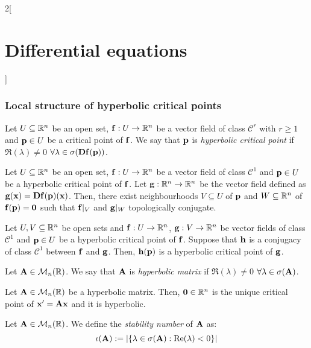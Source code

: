 \documentclass[../../../main_math.tex]{subfiles}
\begin{document}
\begin{multicols}{2}[\section{Differential equations}]
  \subsubsection{Local structure of hyperbolic critical points}
  \begin{definition}
    Let $U\subseteq \mathbb{R}^n$ be an open set, $\boldsymbol{\mathrm{f}}:U\rightarrow\mathbb{R}^n$ be a vector field of class $\mathcal{C}^r$ with $r\geq 1$ and $\boldsymbol{\mathrm{p}}\in U$ be a critical point of $\boldsymbol{\mathrm{f}}$. We say that $\boldsymbol{\mathrm{p}}$ is \emph{hyperbolic critical point} if $\Re(\lambda)\ne 0$ $\forall \lambda\in\sigma(\boldsymbol{\mathrm{Df}}(\boldsymbol{\mathrm{p}}))$.
  \end{definition}
  \begin{theorem}
    Let $U\subseteq \mathbb{R}^n$ be an open set, $\boldsymbol{\mathrm{f}}:U\rightarrow\mathbb{R}^n$ be a vector field of class $\mathcal{C}^1$ and $\boldsymbol{\mathrm{p}}\in U$ be a hyperbolic critical point of $\boldsymbol{\mathrm{f}}$. Let $\boldsymbol{\mathrm{g}}:\mathbb{R}^n\rightarrow\mathbb{R}^n$ be the vector field defined as $\boldsymbol{\mathrm{g}}(\boldsymbol{\mathrm{x}})=\boldsymbol{\mathrm{Df}}(\boldsymbol{\mathrm{p}})(\boldsymbol{\mathrm{x}})$. Then, there exist neighbourhoods $V\subseteq U$ of $\boldsymbol{\mathrm{p}}$ and $W\subseteq \mathbb{R}^n$ of $\boldsymbol{\mathrm{f}}(\boldsymbol{\mathrm{p}})=\boldsymbol{\mathrm{0}}$ such that $\boldsymbol{\mathrm{f}}|_V$ and $\boldsymbol{\mathrm{g}}|_W$ topologically conjugate.
  \end{theorem}
  \begin{corollary}
    Let $U,V\subseteq \mathbb{R}^n$ be open sets and $\boldsymbol{\mathrm{f}}:U\rightarrow\mathbb{R}^n$, $\boldsymbol{\mathrm{g}}:V\rightarrow\mathbb{R}^n$ be vector fields of class $\mathcal{C}^1$ and $\boldsymbol{\mathrm{p}}\in U$ be a hyperbolic critical point of $\boldsymbol{\mathrm{f}}$. Suppose that $\boldsymbol{\mathrm{h}}$ is a conjugacy of class $\mathcal{C}^1$ between $\boldsymbol{\mathrm{f}}$ and $\boldsymbol{\mathrm{g}}$. Then, $\boldsymbol{\mathrm{h}}(\boldsymbol{\mathrm{p}})$ is a hyperbolic critical point of $\boldsymbol{\mathrm{g}}$.
  \end{corollary}
  \begin{definition}
    Let $\boldsymbol{\mathrm{A}}\in\mathcal{M}_n(\mathbb{R})$. We say that $\boldsymbol{\mathrm{A}}$ is \emph{hyperbolic matrix} if $\Re(\lambda)\ne 0$ $\forall\lambda\in\sigma(\boldsymbol{\mathrm{A}})$.
  \end{definition}
  \begin{proposition}
    Let $\boldsymbol{\mathrm{A}}\in\mathcal{M}_n(\mathbb{R})$ be a hyperbolic matrix. Then, $\boldsymbol{\mathrm{0}}\in\mathbb{R}^n$ is the unique critical point of $\boldsymbol{\mathrm{x}}'=\boldsymbol{\mathrm{A}}\boldsymbol{\mathrm{x}}$ and it is hyperbolic.
  \end{proposition}
  \begin{definition}
    Let $\boldsymbol{\mathrm{A}}\in\mathcal{M}_n(\mathbb{R})$. We define the \emph{stability number} of $\boldsymbol{\mathrm{A}}$ as: $$\iota(\boldsymbol{\mathrm{A}}):=|\{\lambda\in\sigma(\boldsymbol{\mathrm{A}}):\Re(\lambda)<0\}|$$
  \end{definition}
  \begin{theorem}

\end{theorem}
\end{multicols}
\end{document}
